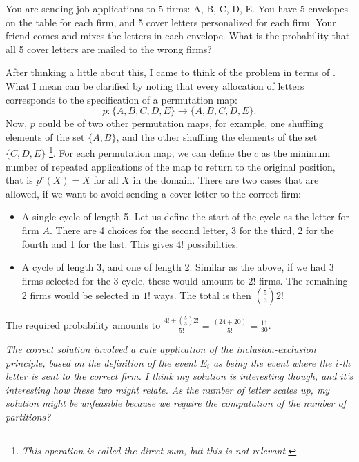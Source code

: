 \begin{qanda} %
    \Q 
    You are sending job applications to 5 firms: A, B, C, D, E.
    You have 5 envelopes on the table for each firm, and 5 cover letters personalized for each firm.
    Your friend comes and mixes the letters in each envelope.
    What is the probability that all 5 cover letters are mailed to the wrong firms?

    \A 
    After thinking a little about this, I came to think of the problem in terms of . What I mean can be clarified by noting that every allocation of letters corresponds to the specification of a permutation map:
    \[
    p\colon \{A, B, C, D, E\}\to \{A, B, C, D, E\}.
    \]
    Now, $p$ could be  of two other permutation maps, for example, one shuffling elements of the set $\{A, B\}$, and the other shuffling the elements of the set $\{C, D, E\}$ \footnote{\textit{ This  operation is called the direct sum, but this is not relevant.}}.
    For each permutation map, we can define the  $c$ as the minimum number of repeated applications of the map to return to the original position, that is $p^c(X) = X$ for all $X$ in the domain.
    There are two cases that are allowed, if we want to avoid sending a cover letter to the correct firm:
    \begin{itemize}
        \item A single cycle of length 5. Let us define the start of the cycle as the letter for firm $A$. There are 4 choices for the second letter, 3 for the third, 2 for the fourth and 1 for the last. This gives $4!$ possibilities.
        \item A cycle of length 3, and one of length 2. Similar as the above, if we had 3 firms selected for the 3-cycle, these would amount to $2!$ firms. The remaining 2 firms would be selected in $1!$ ways.
        The total is then $\binom{5}{3} 2!$
    \end{itemize}
    The required probability amounts to $\frac{4! + \binom{5}{3} 2!}{5!} = \frac{(24 + 20)}{5!} = \frac{11}{30}$.

    \emph{
    The correct solution involved a cute application of the inclusion-exclusion principle, based on the definition of the event $E_i$ as being the event where the $i$-th letter is sent to the correct firm. I think my solution is interesting though, and it's interesting how these two might relate.
    As the number of letter scales up, my solution might be unfeasible because we require the computation of the number of partitions?
    }
\end{qanda}

